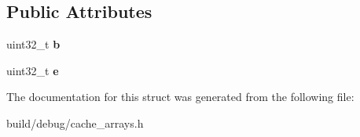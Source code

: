 \subsection*{Public Attributes}
\begin{DoxyCompactItemize}
\item 
\hypertarget{structSetAssocCands_ae143c28198fff50fbe143f0971cd50bf}{uint32\-\_\-t {\bfseries b}}\label{structSetAssocCands_ae143c28198fff50fbe143f0971cd50bf}

\item 
\hypertarget{structSetAssocCands_a6ebce25ce98f3658985d95b6c82690db}{uint32\-\_\-t {\bfseries e}}\label{structSetAssocCands_a6ebce25ce98f3658985d95b6c82690db}

\end{DoxyCompactItemize}


The documentation for this struct was generated from the following file\-:\begin{DoxyCompactItemize}
\item 
build/debug/cache\-\_\-arrays.\-h\end{DoxyCompactItemize}
